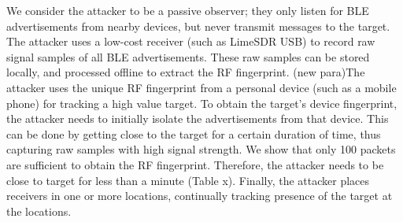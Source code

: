 \color{black}
 {We consider the attacker to be a passive observer; they only listen for BLE advertisements from nearby devices, but never transmit messages to the target. The attacker uses a low-cost receiver (such as LimeSDR USB) to record raw signal samples of all BLE advertisements. These raw samples can be stored locally, and processed offline to extract the RF fingerprint. (new para)The attacker uses the unique RF fingerprint from a personal device (such as a mobile phone) for tracking a high value target. To obtain the target's device fingerprint, the attacker needs to initially isolate the advertisements from that device. This can be done by getting close to the target for a certain duration of time, thus capturing raw samples with high signal strength. We show that only 100 packets are sufficient to obtain the RF fingerprint. Therefore, the attacker needs to be close to target for less than a minute (Table x). Finally, the attacker places receivers in one or more locations, continually tracking presence of the target at the locations.
}



